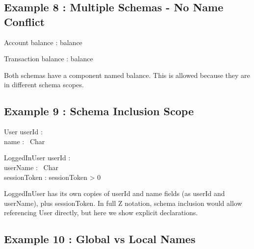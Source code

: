 \documentclass[a4paper,10pt,fleqn]{article}
\begin{document}
\bigskip

\subsection*{Example 8 : Multiple Schemas - No Name Conflict}

\begin{schema}{Account}
balance : \nat
\where
balance 
\end{schema}

\begin{schema}{Transaction}
balance : \nat
\where
balance 
\end{schema}

\noindent Both schemas have a component named balance. This is allowed because they are in different schema scopes.

\bigskip

\subsection*{Example 9 : Schema Inclusion Scope}

\begin{schema}{User}
userId : \nat \\
name : \seq~Char
\end{schema}

\begin{schema}{LoggedInUser}
userId : \nat \\
userName : \seq~Char \\
sessionToken : \nat
\where
sessionToken > 0
\end{schema}

\noindent LoggedInUser has its own copies of userId and name fields (as userId and userName), plus sessionToken. In full Z notation, schema inclusion would allow referencing User directly, but here we show explicit declarations.

\bigskip

\subsection*{Example 10 : Global vs Local Names}

\begin{zed}
[GlobalType]
\end{zed}
\end{document}

